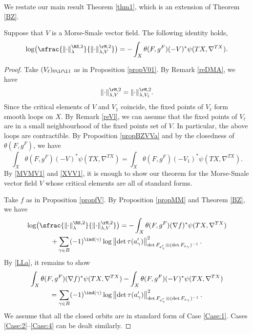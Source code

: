 We restate our main
result Theorem \ref{thm1}, which is an extension of Theorem \ref{BZ}.
\begin{thm}\label{Thm1}
Suppose that $V$ is a Morse-Smale vector field. The following identity holds,
\begin{equation*}
\log\bigl(\sfrac{\|{\cdot}\|^{\RS,2}_{\lambda}}{\|{\cdot}\|^{\rM,2}_{\lambda,V}}\bigr)=-\int_{X}\theta(F,g^{F})(-V)^{*}\psi(TX,\nabla^{TX}).
\end{equation*}
\end{thm}
\begin{proof}
Take $(V_{\ell})_{0\l \ell\l 1}$ as in Proposition
\ref{propV01}.
By Remark \ref{reDMA}, we have
\begin{equation}\label{MVMV1}
\|{\cdot}\|^{\rM,2}_{\lambda,V}=\|{\cdot}\|^{\rM,2}_{\lambda,V_{1}}.
\end{equation}
Since the critical elements of $V$ and $V_{1}$ coincide, the fixed points of $V_{\ell}$ form smooth loops on $X$. By Remark \ref{reVl}, we can assume that the fixed points of $V_{\ell}$ are in a small neighbourhood of
the fixed points set of $V$. In particular, the above loops are
contractible. By Proposition \ref{propBZVVa} and by the closedness of $\theta(F,g^{F})$, we have
\begin{equation}\label{XVV1}
\int_{X}\theta(F,g^{F})(-V)^{*}\psi(TX,
\nabla^{TX})=\int_{X}\theta(F,g^{F})(-V_{1})^{*}\psi(TX, \nabla^{TX}).
\end{equation}
By \eqref{MVMV1} and \eqref{XVV1}, it is enough to show our theorem
for the Morse-Smale vector field $V$ whose critical elements are all
of standard forms.

Take $f$ as in Proposition
\ref{propfV}.
By Proposition \ref{propMM} and Theorem \ref{BZ}, we have
\begin{multline}\label{LLa}
\log\bigl(\sfrac{\|{\cdot}\|^{\RS,2}_{\lambda}}{\|{\cdot}\|^{\rM,2}_{\lambda,V}}\bigr)=-\int_{X}\theta(F,g^{F})(\nabla f)^{*}\psi(TX, \nabla ^{TX})\\
+\sum_{\gamma\in
B}(-1)^{\ind(\gamma)}\log
\left\|{\det\,}\tau(a_{\gamma}')\right\|^{2}_{\det
F_{x'_{\gamma}}\otimes (\det
F_{x_{\gamma}})^{-1}}.
\end{multline}
By \eqref{LLa}, it remains to show
\begin{multline}\label{eqaaa}
\int_{X}\theta(F,g^{F})(\nabla
f)^{*}\psi(TX,
\nabla^{TX})-\int_{X}\theta(F,g^{F})(-V)^{*}\psi(TX,\nabla^{TX})\\
=\sum_{\gamma\in
B}(-1)^{\ind(\gamma)}\log
\left\|{\det\,}\tau(a_{\gamma}')\right\|^{2}_{\det
F_{x'_{\gamma}}\otimes (\det
F_{x_{\gamma}})^{-1}}.
\end{multline}
We assume that all the closed orbits are in standard form
of Case \ref{Case:1}. Cases \ref{Case:2}--\ref{Case:4} can be dealt similarly.


\end{proof}
